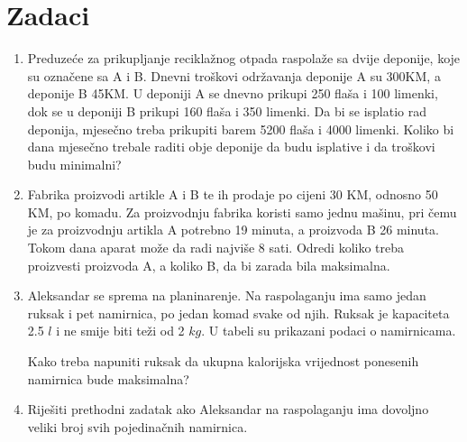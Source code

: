 \documentclass[b5paper, utf8, 11pt, colorlinks]{book}
\theoremstyle{definition}
\begin{document}
\section{Zadaci}
\begin{enumerate}
	
	\item Preduzeće za prikupljanje reciklažnog otpada raspolaže sa dvije deponije, koje su označene sa A i B. Dnevni troškovi održavanja deponije A su 300KM, a deponije B 45KM.  U deponiji A se dnevno prikupi 250 flaša i 100 limenki, dok se u deponiji B prikupi 160 flaša i 350 limenki. Da bi se isplatio rad deponija, mjesečno treba prikupiti barem 5200 flaša i 4000 limenki.
	Koliko bi dana mjesečno trebale raditi obje deponije da budu isplative i da troškovi budu minimalni?
	
	\item Fabrika proizvodi artikle A i B te ih prodaje po cijeni 30 KM, odnosno 50 KM, po komadu. Za
	proizvodnju fabrika koristi samo jednu mašinu, pri čemu je za proizvodnju artikla A potrebno 19
	minuta, a proizvoda B 26 minuta. Tokom dana aparat može da radi najviše 8 sati. Odredi koliko treba
	proizvesti proizvoda A, a koliko B, da bi zarada bila maksimalna.
	
	\item Aleksandar se sprema na planinarenje. Na raspolaganju ima samo jedan ruksak i pet namirnica, po jedan
	komad svake od njih. Ruksak je kapaciteta 2.5 $l$ i ne smije biti teži od 2 $kg$. U tabeli su
	prikazani podaci o namirnicama.
	\begin{table}[H]
		\centering
	\end{table}
	Kako treba napuniti ruksak da ukupna kalorijska vrijednost ponesenih namirnica bude maksimalna?
	
	\item Riješiti prethodni zadatak ako Aleksandar na raspolaganju ima dovoljno veliki broj svih pojedinačnih namirnica.
	

\end{enumerate}
\end{document}

